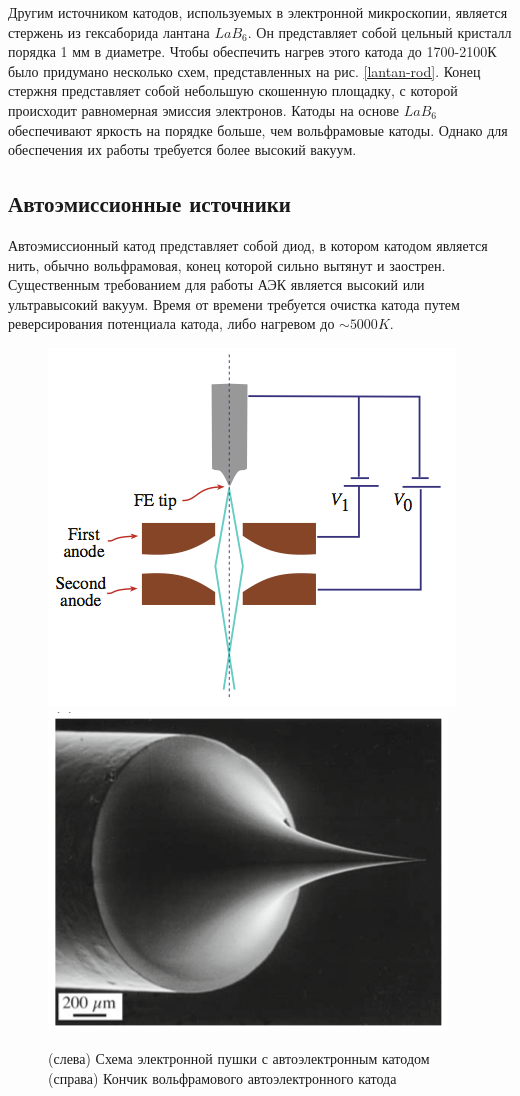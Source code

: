 \documentclass[12pt]{article}
\begin{document}
Другим источником катодов, используемых в электронной микроскопии, является стержень из гексаборида лантана $LaB_6$. Он представляет собой цельный кристалл порядка 1 мм в диаметре. Чтобы обеспечить нагрев этого катода до 1700-2100К было придумано несколько схем, представленных на рис. \ref{lantan-rod}. Конец стержня представляет собой небольшую скошенную площадку, с которой происходит равномерная эмиссия электронов. Катоды на основе $LaB_6$ обеспечивают яркость на порядке больше, чем вольфрамовые катоды. Однако для обеспечения их работы требуется более высокий вакуум.

\subsection*{Автоэмиссионные источники}

Автоэмиссионный катод представляет собой диод, в котором катодом является нить, обычно вольфрамовая, конец которой сильно вытянут и заострен. Существенным требованием для работы АЭК является высокий или ультравысокий вакуум. Время от времени требуется очистка катода путем реверсирования потенциала катода, либо нагревом до $\sim 5000 K$.

\begin{figure}[!ht]
\includegraphics[width=0.5\linewidth]{pictures/feg1.png}
\includegraphics[width=0.5\linewidth]{pictures/feg2.png}
\caption{(слева) Схема электронной пушки с автоэлектронным катодом (справа) Кончик вольфрамового  автоэлектронного катода}
\end{figure}
\end{document}
